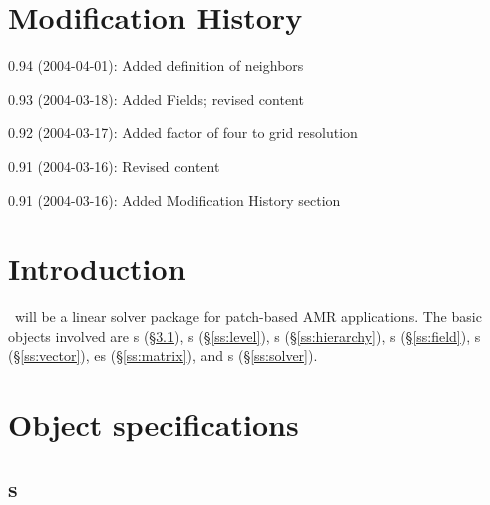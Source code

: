\documentclass[11pt]{article}
\begin{document}

\section{Modification History}

\BeginDESCRIPTION
\item[0.94 (2004-04-01):] Added definition of neighbors
\item[0.93 (2004-03-18):] Added Fields; revised content
\item[0.92 (2004-03-17):] Added factor of four to grid resolution
\item[0.91 (2004-03-16):] Revised content
\item[0.91 (2004-03-16):] Added Modification History section
\EndDESCRIPTION

\section{Introduction}

\amrSolve\ will be a linear solver package for patch-based AMR applications.
The basic objects involved are 
%
s (\S\ref{ss:grid}), 
s (\S\ref{ss:level}), 
s (\S\ref{ss:hierarchy}), 
s (\S\ref{ss:field}), 
s (\S\ref{ss:vector}), 
es (\S\ref{ss:matrix}), and
s (\S\ref{ss:solver}).

\section{Object specifications}


\subsection{s} \label{ss:grid}
\end{document}
